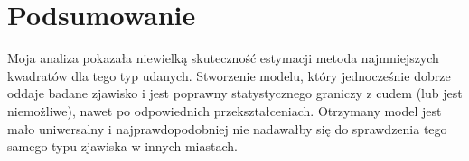 \section{Podsumowanie}\label{sec:podsumowanie}

Moja analiza pokazała niewielką skuteczność estymacji metoda najmniejszych kwadratów dla tego typ udanych.
Stworzenie modelu, który jednocześnie dobrze oddaje badane zjawisko i jest poprawny statystycznego graniczy z cudem (lub jest niemożliwe), nawet po odpowiednich przekształceniach.
Otrzymany model jest mało uniwersalny i najprawdopodobniej nie nadawałby się do sprawdzenia tego samego typu zjawiska w innych miastach.
